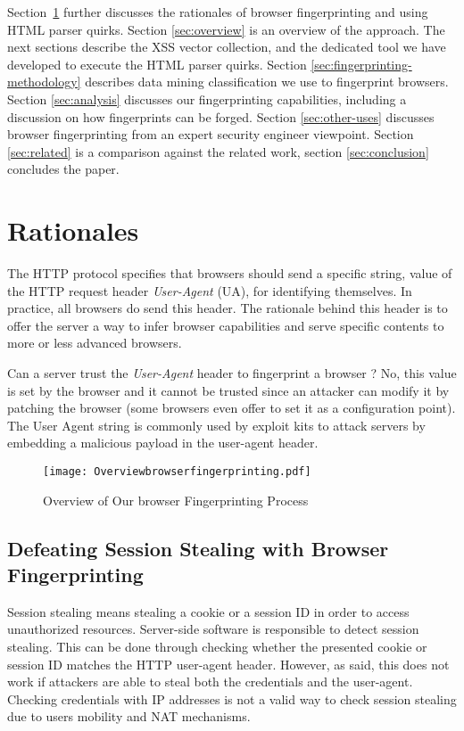 \documentclass[10pt]{IEEEtran}
\begin{document}
Section~\ref{sec:rationales} further discusses the rationales of browser fingerprinting
and using HTML parser quirks.
Section \ref{sec:overview} is an overview of the approach.
The next sections describe the XSS vector 
collection, and the dedicated tool we have developed to execute the HTML parser quirks. 
Section \ref{sec:fingerprinting-methodology} describes data mining classification we use
to fingerprint browsers. 
Section \ref{sec:analysis} discusses our fingerprinting capabilities, including a discussion on how fingerprints can be forged.
Section \ref{sec:other-uses} discusses browser fingerprinting from an expert security engineer viewpoint.
Section \ref{sec:related} is a comparison against the related work, section \ref{sec:conclusion} concludes the paper.






\section{Rationales}
\label{sec:rationales}
The HTTP protocol specifies that browsers should send a specific string, 
value of the HTTP request header \emph{User-Agent}  (UA), for identifying themselves.
In practice, all browsers do send this header. 
The rationale behind this header is to offer the server a way to infer
browser capabilities and serve specific contents to more or less advanced 
browsers. 


Can a server trust the \emph{User-Agent} header to fingerprint a browser ?
No, this value is set by the browser and it cannot be trusted since an
attacker can modify it by patching the browser (some browsers even offer to set
it as a configuration point).
The User Agent string is commonly used by exploit kits to attack servers by embedding a malicious payload in the 
 user-agent header.
 
 
\begin{figure*}
\texttt{[image: Overviewbrowserfingerprinting.pdf]}
\caption{Overview of Our browser Fingerprinting Process}
\label{fig:overview}
\end{figure*}






\subsection{Defeating Session Stealing with Browser Fingerprinting}
Session stealing means stealing a cookie or a session ID in order to access unauthorized resources.
Server-side software is responsible to detect session stealing.
This can be done through checking whether the presented cookie or session ID matches the HTTP 
user-agent header. However, as said, this does not work if attackers are able to steal both the 
credentials and the user-agent. Checking credentials with IP addresses is not a valid way to 
check session stealing due to users mobility and NAT mechanisms. 
\end{document}
